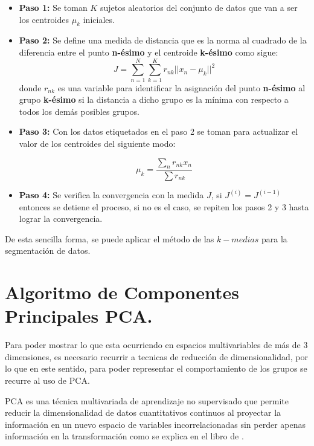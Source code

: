 \documentclass[11pt, letterpaper]{article}
\begin{document}
\begin{itemize}
	\item \textbf{Paso 1:} Se toman $K$ sujetos aleatorios del conjunto de datos que van a ser los centroides $\mu_k$ iniciales.
	
	
	\item \textbf{Paso 2:} Se define una medida de distancia que es la norma al cuadrado de la diferencia entre el punto \textbf{n-ésimo} y el centroide \textbf{k-ésimo} como sigue: $$J = \sum_{n=1}^{N} \sum_{k = 1}^{K}{r_{nk}||x_n-\mu_k||^2}$$ donde $r_{nk}$ es una variable para identificar la asignación del punto \textbf{n-ésimo} al grupo \textbf{k-ésimo} si la distancia a dicho grupo es la mínima con respecto a todos los demás posibles grupos.
	
	\newpage
	
	\item \textbf{Paso 3:} Con los datos etiquetados en el paso 2 se toman para actualizar el valor de los centroides del siguiente modo:
	
	$$\mu_k = \frac{\sum_n{r_{nk}x_n }}{\sum r_{nk}}$$
	
	\item  \textbf{Paso 4:} Se verifica la convergencia con la medida $J$, si $J^{(i)} = J^{(i-1)}$ entonces se detiene el proceso, si no es el caso, se repiten los pasos 2 y 3 hasta lograr la convergencia. 
	
\end{itemize}

De esta sencilla forma, se puede aplicar el método de las $k-medias$ para la segmentación de datos.

\newpage

\section{Algoritmo de Componentes Principales PCA.}

Para poder mostrar lo que esta ocurriendo en espacios multivariables de más de 3 dimensiones, es necesario recurrir a tecnicas de reducción de dimensionalidad, por lo que en este sentido, para poder representar el comportamiento de los grupos se recurre al uso de PCA.

PCA es una técnica multivariada de aprendizaje no supervisado que permite reducir la dimensionalidad de datos cuantitativos continuos al proyectar la información en un nuevo espacio de variables incorrelacionadas sin perder apenas información en la transformación como se explica en el libro de \cite{johnson2007}. 
\end{document}
